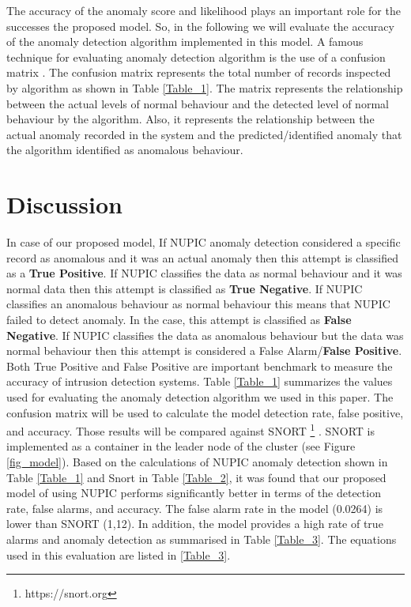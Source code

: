 \documentclass[graybox]{svmult}
\begin{document}
The accuracy of the anomaly score and likelihood plays an important role for the successes the proposed model. So, in the following we will evaluate the accuracy of the anomaly detection algorithm implemented in this model. A famous technique for evaluating anomaly detection algorithm is the use of a confusion matrix \cite{kohavi1998confusion}. The confusion matrix represents the total number of records inspected by algorithm as shown in Table \ref{Table_1}. The matrix represents the relationship between the actual levels of normal behaviour and the detected level of normal behaviour by the algorithm. Also, it represents the relationship between the actual anomaly recorded in the system and the predicted/identified anomaly that the algorithm identified as anomalous behaviour.   
 \section{Discussion}
\label{sec:disc}

In case of our proposed model, If NUPIC anomaly detection considered a specific record as anomalous and it was an actual anomaly then this attempt is classified as a \textbf{True Positive}. If NUPIC classifies the data as normal behaviour and it was normal data then this attempt is classified as \textbf{True Negative}. If NUPIC classifies an anomalous behaviour as normal behaviour this means that NUPIC failed to detect anomaly. In the case, this attempt is classified as \textbf{False Negative}. If NUPIC classifies the data as anomalous behaviour but the data was normal behaviour then this attempt is considered a False Alarm/\textbf{False Positive}. Both True Positive and False Positive are important benchmark to measure the accuracy of intrusion detection systems. Table \ref{Table_1} summarizes the values used for evaluating the anomaly detection algorithm we used in this paper. The confusion matrix will be used to calculate the model detection rate, false positive, and accuracy. Those results will be compared against SNORT \footnote{https://snort.org} \cite{roesch1999snort}. SNORT is implemented as a container in the leader node of the cluster (see Figure \ref{fig_model}). Based on the calculations of NUPIC anomaly detection shown in Table \ref{Table_1} and Snort in Table \ref{Table_2}, it was found that our proposed model of using NUPIC performs significantly better in terms of the detection rate, false alarms, and accuracy. The false alarm rate in the model (0.0264) is lower than SNORT (1,12). In addition, the model provides a high rate of true alarms and anomaly detection as summarised in Table \ref{Table_3}. The equations used in this evaluation are listed in \ref{Table_3}.    
 
\end{document}
